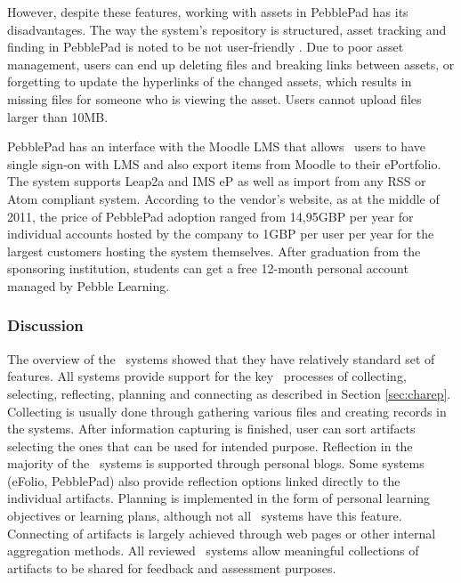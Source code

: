 However, despite these features, working with assets in PebblePad has its
disadvantages. The way the system's repository is structured, asset tracking and
finding in PebblePad is noted to be not user-friendly \citep{Overton2009}. Due
to poor asset management, users can end up deleting files and breaking links
between assets, or forgetting to update the hyperlinks of the changed assets,
which results in missing files for someone who is viewing the asset. Users
cannot upload files larger than 10MB.

PebblePad has an interface with the Moodle LMS that allows \ep~users to have
single sign-on with LMS and also export items from Moodle to their ePortfolio.
The system supports Leap2a and IMS eP as well as import from any RSS or Atom
compliant system. According to the vendor's website, as at the middle of 2011,
the price of PebblePad adoption ranged from 14,95GBP per year for individual
accounts hosted by the company to 1GBP per user per year for the largest
customers hosting the system themselves. After graduation from the sponsoring
institution, students can get a free 12-month personal account managed by Pebble
Learning.

\subsubsection{Discussion}
The overview of the \ep~systems showed that they have relatively standard set of
features. All systems provide support for the key \ep~processes of collecting,
selecting, reflecting, planning and connecting as described in Section
\ref{sec:charep}. Collecting is usually done through gathering various files and
creating records in the systems. After information capturing is finished, user
can sort artifacts selecting the ones that can be used for intended purpose.
Reflection in the majority of the \ep~systems is supported through personal
blogs. Some systems (eFolio, PebblePad) also provide reflection options linked
directly to the individual artifacts. Planning is implemented in the form of
personal learning objectives or learning plans, although not all \ep~systems
have this feature. Connecting of artifacts is largely achieved through web pages
or other internal aggregation methods. All reviewed \ep~systems allow meaningful
collections of artifacts to be shared for feedback and assessment purposes.

